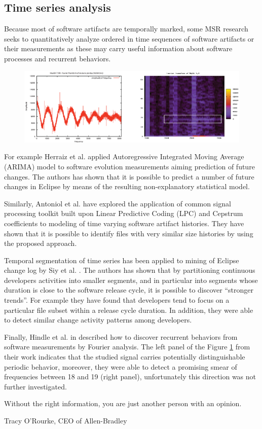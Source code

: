 \subsection{Time series analysis}\label{chapter2_section-tsanalysis}
Because most of software artifacts are temporally marked, some MSR research seeks to quantitatively analyze ordered 
in time sequences of software artifacts or their measurements as these may carry useful information about software 
processes and recurrent behaviors. 

\begin{figure}[t!]
   \centering
   \includegraphics[width=145mm]{figures/FourrierMySQL.eps}
   \caption{}
   \label{fig:mysql-fourrier}
\end{figure}

For example Herraiz et al. \cite{citeulike:6544685} applied Autoregressive Integrated Moving Average (ARIMA) model 
to software evolution measurements aiming prediction of future changes. 
The authors has shown that it is possible to predict a number of future changes in 
Eclipse by means of the resulting non-explanatory statistical model. 

Similarly, Antoniol et al. \cite{citeulike:3378725} have explored the application of common signal processing toolkit 
built upon Linear Predictive Coding (LPC) and Cepstrum coefficients to modeling of time varying software artifact 
histories. They have shown that it is possible to identify files with very similar size histories by using the 
proposed approach.

Temporal segmentation of time series has been applied to mining of Eclipse change log by Siy et al. \cite{citeulike:10896305}.
The authors has shown that by partitioning continuous developers activities into smaller segments, 
and in particular into segments whose duration is close to the software release cycle,
it is possible to discover ``stronger trends''. For example they have found that developers tend to focus on a particular file 
subset within a release cycle duration. In addition, they were able to detect similar change activity patterns among developers.

Finally, Hindle et al. in \cite{citeulike:10377345} described how to discover recurrent behaviors from software measurements 
by Fourier analysis. The left panel of the Figure \ref{fig:mysql-fourrier} from their work indicates that the studied 
signal carries potentially distinguishable periodic behavior, moreover, they were able to detect a promising smear 
of frequencies between 18 and 19 (right panel), unfortunately this direction was not further investigated.

\epigraph{Without the right information, you are just another person with an opinion.}{Tracy O'Rourke, CEO of Allen-Bradley}
